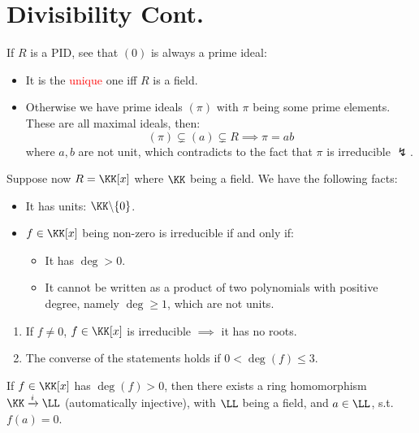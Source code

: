 \section{Divisibility Cont.}

\begin{remark}
	If \( R \) is a PID, see that \( (0) \) is always a prime ideal:
	\begin{itemize}
		\item It is the \textcolor{red}{unique} one iff \( R \) is a field.
		\item Otherwise we have prime ideals \( (\pi) \) with \( \pi \) being some prime elements. These
		      are all maximal ideals, then:
		      \[
			      (\pi) \subsetneq (a) \subsetneq R \implies \pi = ab
		      \]
		      where \( a,b \) are not unit, which contradicts to the fact that \( \pi \) is irreducible
		      $\lightning$.
	\end{itemize}
\end{remark}

\begin{remark}
	Suppose now \( R = \KK[x] \) where \( \KK \) being a field. We have the following facts:
	\begin{itemize}
		\item It has units: \( \KK \backslash \{0\} \).
		\item \( f \in \KK[x] \) being non-zero is irreducible if and only if:
		      \begin{itemize}
			      \item It has \( \deg > 0 \).
			      \item It cannot be written as a product of two polynomials with positive degree, namely \(
			            \deg \geq 1 \), which are not units.
		      \end{itemize}
	\end{itemize}
\end{remark}

\begin{note}
	\leavevmode
	\begin{enumerate}
		\item If \( f \ne 0 \), \( f\in \KK[x] \) is irreducible \( \implies \) it has no roots.
		\item The converse of the statements holds if \( 0 < \deg(f) \leq 3 \).
	\end{enumerate}
\end{note}

\begin{proposition}
	If \( f\in \KK[x] \) has \( \deg(f) > 0 \), then there exists a ring homomorphism \(
	\KK\xrightarrow{i} \LL \) (automatically injective), with \( \LL \) being a field, and
	\( a\in \LL \), s.t. \( f(a) = 0 \).
\end{proposition}

